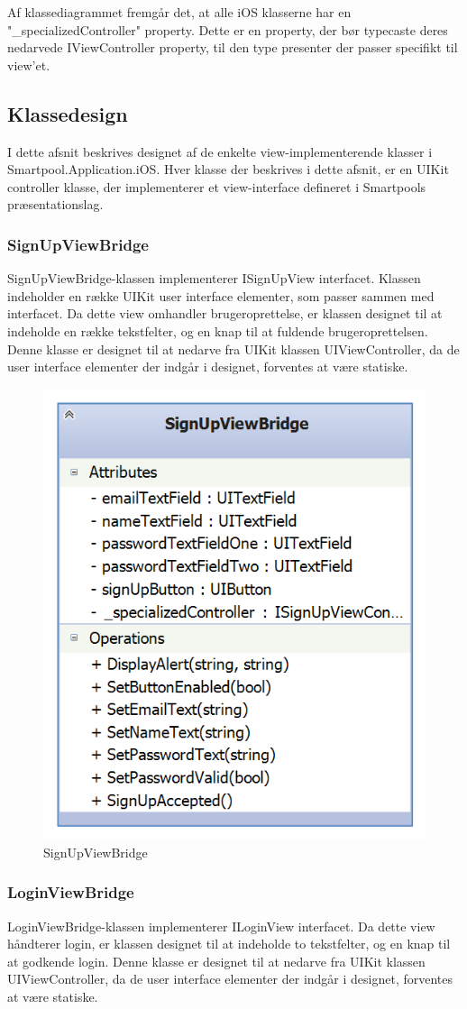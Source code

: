 Af klassediagrammet fremgår det, at alle iOS klasserne har en "\_specializedController" property. Dette er en property, der bør typecaste deres nedarvede IViewController property, til den type presenter der passer specifikt til view'et.

\subsection{Klassedesign}
I dette afsnit beskrives designet af de enkelte view-implementerende klasser i Smartpool.Application.iOS. Hver klasse der beskrives i dette afsnit, er en UIKit controller klasse, der implementerer et view-interface defineret i Smartpools præsentationslag.

\subsubsection{SignUpViewBridge}
SignUpViewBridge-klassen implementerer ISignUpView interfacet. Klassen indeholder en række UIKit user interface elementer, som passer sammen med interfacet. Da dette view omhandler brugeroprettelse, er klassen designet til at indeholde en række tekstfelter, og en knap til at fuldende brugeroprettelsen. Denne klasse er designet til at nedarve fra UIKit klassen UIViewController, da de user interface elementer der indgår i designet, forventes at være statiske.

\begin{figure}
	\centering
	\includegraphics[width=0.3\linewidth]{figs/design/ios_signupviewbridge}
	\caption{SignUpViewBridge}
	\label{fig:ios_signupviewbridge}
\end{figure}

\subsubsection{LoginViewBridge}
LoginViewBridge-klassen implementerer ILoginView interfacet. Da dette view håndterer login, er klassen designet til at indeholde to tekstfelter, og en knap til at godkende login. Denne klasse er designet til at nedarve fra UIKit klassen UIViewController, da de user interface elementer der indgår i designet, forventes at være statiske.

